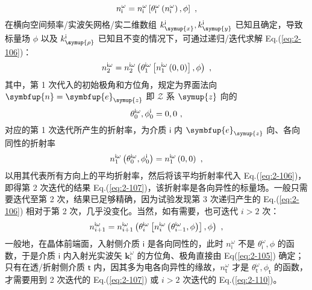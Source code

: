 \begin{equation} \label{eq:2-106}
	\abovedisplayskip=12pt
	\belowdisplayskip=12pt
	n^{\omega}_{\mathsf{i}} = n^{\omega}_{\mathsf{i}} \left[ \theta^{\omega}_{\mathsf{i}} \left( n^{\omega}_{\mathsf{i}} \right), \phi \right] ~,
\end{equation}
在横向空间频率/实波矢网格/实二维数组 $k^{\mathsf{i}}_{\symup{x}}, k^{\mathsf{i}}_{\symup{y}}$ 已知且确定，导致标量场 $\phi$ 以及 $k^{\mathsf{i}}_{\symup{\rho}}$ 已知且不变的情况下，可通过递归/迭代\cite{grechinFourierSpaceMethod2014}求解 Eq.(\ref{eq:2-106})：
\begin{equation} \label{eq:2-107}
	\abovedisplayskip=12pt
	\belowdisplayskip=12pt
	n^{\mathsf{i}\omega}_{2} = n^{\mathsf{i}\omega}_{2} \left( \theta^{\mathsf{i}\omega}_{1} \left[ n^{\mathsf{i}\omega}_{1} \left( 0, 0 \right) \right], \phi \right) ~,
\end{equation}
其中，第 1 次代入的初始极角和方位角，规定为界面法向 $\symbfup{n} = \symbfup{e}_{\symup{z}}$ 即 $\mathcal{Z}$ 系 $\symup{z}$ 向的 
\begin{equation} \label{eq:2-108}
	\abovedisplayskip=12pt
	\belowdisplayskip=12pt
	\theta^{\mathsf{i}\omega}_{0}, \phi^{\mathsf{i}}_{0} = 0, 0 ~,
\end{equation}
对应的第 1 次迭代所产生的折射率，为介质 $\mathsf{i}$ 内 $\symbfup{e}_{\symup{z}}$ 向、各向同性的折射率 
\begin{equation} \label{eq:2-109}
	\abovedisplayskip=13pt
	\belowdisplayskip=13pt
	n^{\mathsf{i}\omega}_{1} \left( \theta^{\mathsf{i}\omega}_{0}, \phi^{\mathsf{i}}_{0} \right) = n^{\mathsf{i}\omega}_{1} \left( 0, 0 \right) ~,
\end{equation}
以用其代表所有方向上的平均折射率，然后将该平均折射率代入 Eq.(\ref{eq:2-106})，即得第 2 次迭代的结果 Eq.(\ref{eq:2-107})，该折射率是各向异性的标量场。一般只需要迭代至第 2 次，结果已足够精确，因为试验发现第 3 次递归产生的 Eq.(\ref{eq:2-106}) 相对于第 2 次，几乎没变化。当然，如有需要，也可迭代 $i > 2$ 次：
\begin{equation} \label{eq:2-110}
	\abovedisplayskip=13pt
	\belowdisplayskip=13pt
	n^{\mathsf{i}\omega}_{i+1} = n^{\mathsf{i}\omega}_{i+1} \left( \theta^{\mathsf{i}\omega}_{i} \left[ n^{\mathsf{i}\omega}_{i} \left( \theta^{\mathsf{i}\omega}_{i-1}, \phi \right) \right], \phi \right) ~,
\end{equation}
一般地，在晶体前端面，入射侧介质 $\mathsf{i}$ 是各向同性的，此时 $n^{\omega}_{\mathsf{i}}$ 不是 $\theta^{\omega}_{\mathsf{i}}, \phi$ 的函数，于是介质 $\mathsf{i}$ 内入射光实波矢 ${\symbf k}^\omega_{\mathsf{i}}$ 的方位角、极角直接由 Eq(\ref{eq:2-105}) 确定；只有在透/折射侧介质 $\mathsf{t}$ 内，因其多为电各向异性的缘故，$n^{\omega}_{\mathsf{t}}$ 才是 $\theta^{\omega}_{\mathsf{t}}, \phi_{\mathsf{t}}$ 的函数，才需要用到 2 次迭代的 Eq.(\ref{eq:2-107}) 或 $i > 2$ 次迭代的 Eq.(\ref{eq:2-110})。

